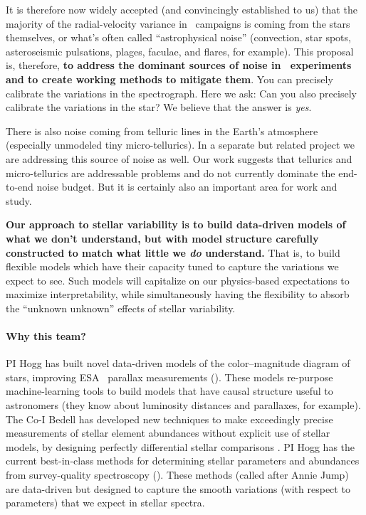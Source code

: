 \documentclass[12pt, letterpaper]{article}
\begin{document}
It is therefore now widely accepted (and convincingly
established to us) that the majority of the radial-velocity variance
in \EPRV\ campaigns is coming from the stars themselves, or what's
often called ``astrophysical noise'' (convection, star spots,
asteroseismic pulsations, plages, faculae, and flares, for example).
This proposal is, therefore, \textbf{to address the dominant sources of
  noise in \EPRV\ experiments and to create working methods to
  mitigate them}.
You can precisely calibrate the variations in the spectrograph.
Here we ask: Can you also precisely calibrate the variations in the star?
We believe that the answer is \emph{yes}.

There is also noise coming from telluric lines in the Earth's atmosphere
(especially unmodeled tiny micro-tellurics).
In a separate but related project \citep{Bedell2019} we are addressing this
source of noise as well.
Our work suggests that tellurics and micro-tellurics are addressable problems
and do not currently dominate the end-to-end noise budget.
But it is certainly also an important area for work and study.

\textbf{Our approach to stellar variability is to build data-driven models of what
we don't understand, but with model structure carefully constructed to
match what little we \emph{do} understand.}
That is, to build flexible models which have their capacity tuned to
capture the variations we expect to see. 
Such models will capitalize on our physics-based expectations to
maximize interpretability, while simultaneously having the flexibility to absorb 
the ``unknown unknown'' effects of stellar variability.

\paragraph{Why this team?}
PI Hogg has built novel data-driven models of the color--magnitude diagram of
stars, improving ESA \Gaia\ parallax measurements (\citealt{Leistedt, Widmark, Anderson}).
These models re-purpose machine-learning tools to build models that
have causal structure useful to astronomers (they know about
luminosity distances and parallaxes, for example).
The Co-I Bedell has developed new techniques to make exceedingly
precise measurements of stellar element abundances without explicit
use of stellar models, by designing perfectly differential stellar
comparisons \citep{Bedell2014, Bedell2018}.
PI Hogg has the current best-in-class methods for determining stellar
parameters and abundances from survey-quality spectroscopy (\citealt{Cannon2, Doppel}).
These methods (called  after Annie Jump) are
data-driven but designed to capture the smooth variations (with
respect to parameters) that we expect in stellar spectra.
\end{document}
